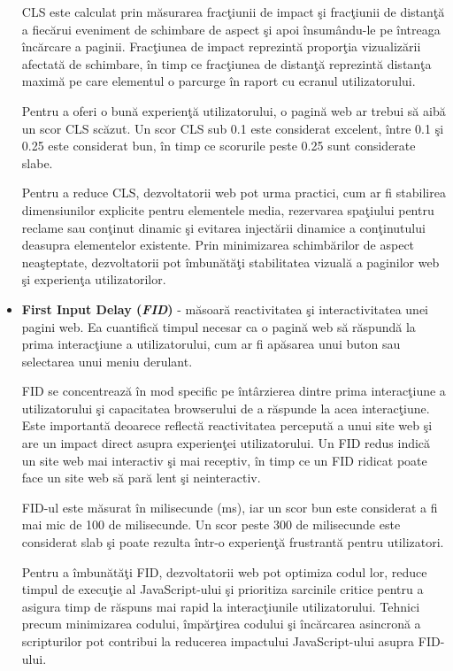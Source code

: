 \documentclass[12pt, a4paper]{report}
\begin{document}
\begin{itemize}
	      CLS este calculat prin m\u asurarea frac\c tiunii de impact \c si frac\c tiunii de distan\c t\u a a fiec\u arui eveniment de schimbare de aspect \c si apoi \^insum\^andu-le pe \^intreaga \^inc\u arcare a paginii. Frac\c tiunea de impact reprezint\u a propor\c tia vizualiz\u arii afectat\u a de schimbare, \^in timp ce frac\c tiunea de distan\c t\u a reprezint\u a distan\c ta maxim\u a pe care elementul o parcurge \^in raport cu ecranul utilizatorului. \cite{cls}

	      Pentru a oferi o bun\u a experien\c t\u a utilizatorului, o pagin\u a web ar trebui s\u a aib\u a un scor CLS sc\u azut. Un scor CLS sub 0.1 este considerat excelent, \^intre 0.1 \c si 0.25 este considerat bun, \^in timp ce scorurile peste 0.25 sunt considerate slabe.

	      Pentru a reduce CLS, dezvoltatorii web pot urma practici, cum ar fi stabilirea dimensiunilor explicite pentru elementele media, rezervarea spa\c tiului pentru reclame sau con\c tinut dinamic \c si evitarea inject\u arii dinamice a con\c tinutului deasupra elementelor existente. Prin minimizarea schimb\u arilor de aspect nea\c steptate, dezvoltatorii pot \^imbun\u at\u a\c ti stabilitatea vizual\u a a paginilor web \c si experien\c ta utilizatorilor.
	\item \textbf{First Input Delay (\emph{FID})} - m\u asoar\u a reactivitatea \c si interactivitatea unei pagini web. Ea cuantific\u a timpul necesar ca o pagin\u a web s\u a r\u aspund\u a la prima interac\c tiune a utilizatorului, cum ar fi ap\u asarea unui buton sau selectarea unui meniu derulant.

	      FID se concentreaz\u a \^in mod specific pe \^int\^arzierea dintre prima interac\c tiune a utilizatorului \c si capacitatea browserului de a r\u aspunde la acea interac\c tiune. Este important\u a deoarece reflect\u a reactivitatea perceput\u a a unui site web \c si are un impact direct asupra experien\c tei utilizatorului. Un FID redus indic\u a un site web mai interactiv \c si mai receptiv, \^in timp ce un FID ridicat poate face un site web s\u a par\u a lent \c si neinteractiv. \cite{fid}

	      FID-ul este m\u asurat \^in milisecunde (ms), iar un scor bun este considerat a fi mai mic de 100 de milisecunde. Un scor peste 300 de milisecunde este considerat slab \c si poate rezulta \^intr-o experien\c t\u a frustrant\u a pentru utilizatori.

	      Pentru a \^imbun\u at\u a\c ti FID, dezvoltatorii web pot optimiza codul lor, reduce timpul de execu\c tie al JavaScript-ului \c si prioritiza sarcinile critice pentru a asigura timp de r\u aspuns mai rapid la interac\c tiunile utilizatorului. Tehnici precum minimizarea codului, \^imp\u ar\c tirea codului \c si \^inc\u arcarea asincron\u a a scripturilor pot contribui la reducerea impactului JavaScript-ului asupra FID-ului.


\end{itemize}
\end{document}
